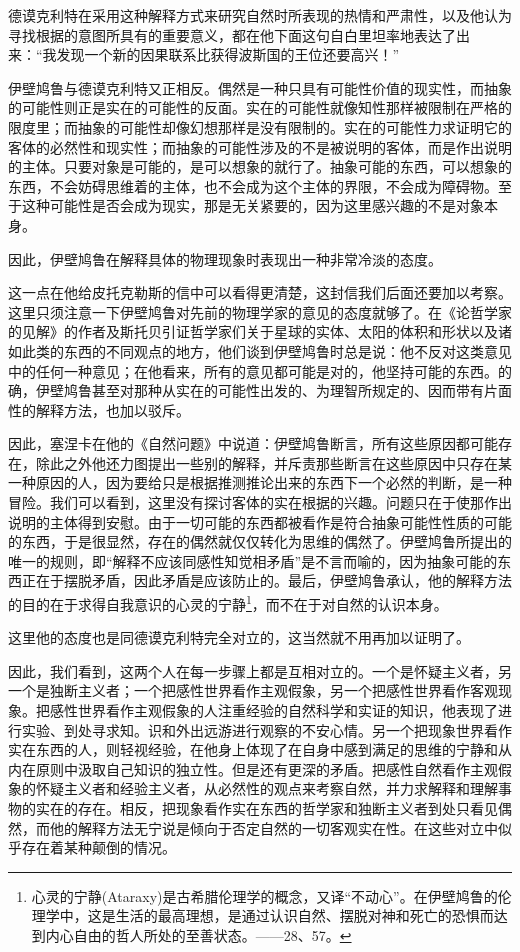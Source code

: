 \documentclass[a4paper,twoside,12pt]{ctexart}
\begin{document}
德谟克利特在采用这种解释方式来研究自然时所表现的热情和严肃性，以及他认为寻找根据的意图所具有的重要意义，都在他下面这句自白里坦率地表达了出来：“我发现一个新的因果联系比获得波斯国的王位还要高兴！”

伊壁鸠鲁与德谟克利特又正相反。偶然是一种只具有可能性价值的现实性，而抽象的可能性则正是实在的可能性的反面。实在的可能性就像知性那样被限制在严格的限度里；而抽象的可能性却像幻想那样是没有限制的。实在的可能性力求证明它的客体的必然性和现实性；而抽象的可能性涉及的不是被说明的客体，而是作出说明的主体。只要对象是可能的，是可以想象的就行了。抽象可能的东西，可以想象的东西，不会妨碍思维着的主体，也不会成为这个主体的界限，不会成为障碍物。至于这种可能性是否会成为现实，那是无关紧要的，因为这里感兴趣的不是对象本身。

因此，伊壁鸠鲁在解释具体的物理现象时表现出一种非常冷淡的态度。

这一点在他给皮托克勒斯的信中可以看得更清楚，这封信我们后面还要加以考察。这里只须注意一下伊壁鸠鲁对先前的物理学家的意见的态度就够了。在《论哲学家的见解》的作者及斯托贝引证哲学家们关于星球的实体、太阳的体积和形状以及诸如此类的东西的不同观点的地方，他们谈到伊壁鸠鲁时总是说：他不反对这类意见中的任何一种意见；在他看来，所有的意见都可能是对的，他坚持可能的东西。的确，伊壁鸠鲁甚至对那种从实在的可能性出发的、为理智所规定的、因而带有片面性的解释方法，也加以驳斥。

因此，塞涅卡在他的《自然问题》中说道：伊壁鸠鲁断言，所有这些原因都可能存在，除此之外他还力图提出一些别的解释，并斥责那些断言在这些原因中只存在某一种原因的人，因为要给只是根据推测推论出来的东西下一个必然的判断，是一种冒险。我们可以看到，这里没有探讨客体的实在根据的兴趣。问题只在于使那作出说明的主体得到安慰。由于一切可能的东西都被看作是符合抽象可能性性质的可能的东西，于是很显然，存在的偶然就仅仅转化为思维的偶然了。伊壁鸠鲁所提出的唯一的规则，即“解释不应该同感性知觉相矛盾”是不言而喻的，因为抽象可能的东西正在于摆脱矛盾，因此矛盾是应该防止的。最后，伊壁鸠鲁承认，他的解释方法的目的在于求得自我意识的心灵的宁静\footnote{心灵的宁静(Ataraxy)是古希腊伦理学的概念，又译“不动心”。在伊壁鸠鲁的伦理学中，这是生活的最高理想，是通过认识自然、摆脱对神和死亡的恐惧而达到内心自由的哲人所处的至善状态。——28、57。}，而不在于对自然的认识本身。

这里他的态度也是同德谟克利特完全对立的，这当然就不用再加以证明了。

因此，我们看到，这两个人在每一步骤上都是互相对立的。一个是怀疑主义者，另一个是独断主义者；一个把感性世界看作主观假象，另一个把感性世界看作客观现象。把感性世界看作主观假象的人注重经验的自然科学和实证的知识，他表现了进行实验、到处寻求知。识和外出远游进行观察的不安心情。另一个把现象世界看作实在东西的人，则轻视经验，在他身上体现了在自身中感到满足的思维的宁静和从内在原则中汲取自己知识的独立性。但是还有更深的矛盾。把感性自然看作主观假象的怀疑主义者和经验主义者，从必然性的观点来考察自然，并力求解释和理解事物的实在的存在。相反，把现象看作实在东西的哲学家和独断主义者到处只看见偶然，而他的解释方法无宁说是倾向于否定自然的一切客观实在性。在这些对立中似乎存在着某种颠倒的情况。
\end{document}
